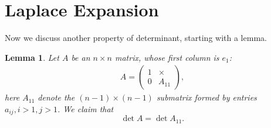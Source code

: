 \documentclass[10pt]{book}
\newtheorem{lemma}[theorem]{Lemma}
\theoremstyle{definition}
\numberwithin{equation}{chapter}
\begin{document}
\medskip

\section{Laplace Expansion}
Now we discuss another property of determinant, starting with a lemma.

\medskip

\begin{lemma}\label{lemma_determinant}
Let $A$ be an $n\times n$ matrix, whose first column is $e_1$:
\begin{align*}
    A = \left(
    \begin{matrix}
        1 & \times\\
        0 & A_{11}
    \end{matrix}
    \right),
\end{align*}
here $A_{11}$ denote the $(n-1)\times(n-1)$ submatrix formed by entries $a_{ij},i>1, j>1$. We claim that $$\det A = \det A_{11}.$$
\end{lemma}
\end{document}
